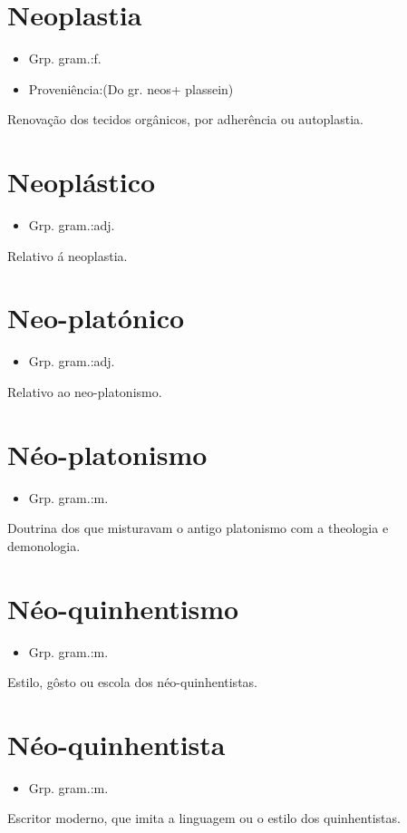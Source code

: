 \section{Neoplastia}
\begin{itemize}
\item {Grp. gram.:f.}
\end{itemize}
\begin{itemize}
\item {Proveniência:(Do gr. \textunderscore neos\textunderscore  + \textunderscore plassein\textunderscore )}
\end{itemize}
Renovação dos tecidos orgânicos, por adherência ou autoplastia.
\section{Neoplástico}
\begin{itemize}
\item {Grp. gram.:adj.}
\end{itemize}
Relativo á neoplastia.
\section{Neo-platónico}
\begin{itemize}
\item {Grp. gram.:adj.}
\end{itemize}
Relativo ao neo-platonismo.
\section{Néo-platonismo}
\begin{itemize}
\item {Grp. gram.:m.}
\end{itemize}
Doutrina dos que misturavam o antigo platonismo com a theologia e demonologia.
\section{Néo-quinhentismo}
\begin{itemize}
\item {Grp. gram.:m.}
\end{itemize}
Estilo, gôsto ou escola dos néo-quinhentistas.
\section{Néo-quinhentista}
\begin{itemize}
\item {Grp. gram.:m.}
\end{itemize}
Escritor moderno, que imita a linguagem ou o estilo dos quinhentistas.
